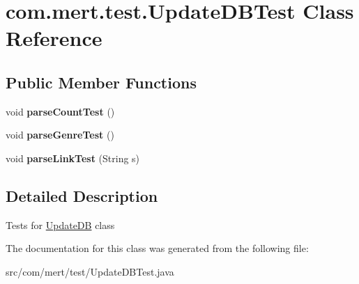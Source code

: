 \hypertarget{classcom_1_1mert_1_1test_1_1_update_d_b_test}{}\section{com.\+mert.\+test.\+Update\+D\+B\+Test Class Reference}
\label{classcom_1_1mert_1_1test_1_1_update_d_b_test}
\subsection*{Public Member Functions}
\begin{DoxyCompactItemize}
\item 
void {\bfseries parse\+Count\+Test} ()\hypertarget{classcom_1_1mert_1_1test_1_1_update_d_b_test_a32e2eb72830e162994219ed892be0a8e}{}\label{classcom_1_1mert_1_1test_1_1_update_d_b_test_a32e2eb72830e162994219ed892be0a8e}

\item 
void {\bfseries parse\+Genre\+Test} ()\hypertarget{classcom_1_1mert_1_1test_1_1_update_d_b_test_a48b6e27fe1561bcaf628066d1fde2d20}{}\label{classcom_1_1mert_1_1test_1_1_update_d_b_test_a48b6e27fe1561bcaf628066d1fde2d20}

\item 
void {\bfseries parse\+Link\+Test} (String s)\hypertarget{classcom_1_1mert_1_1test_1_1_update_d_b_test_a3d4048c926643fa207d6f0fd5df4e8b1}{}\label{classcom_1_1mert_1_1test_1_1_update_d_b_test_a3d4048c926643fa207d6f0fd5df4e8b1}

\end{DoxyCompactItemize}


\subsection{Detailed Description}
Tests for \hyperlink{classcom_1_1mert_1_1_update_d_b}{Update\+DB} class 

The documentation for this class was generated from the following file\+:\begin{DoxyCompactItemize}
\item 
src/com/mert/test/Update\+D\+B\+Test.\+java\end{DoxyCompactItemize}
